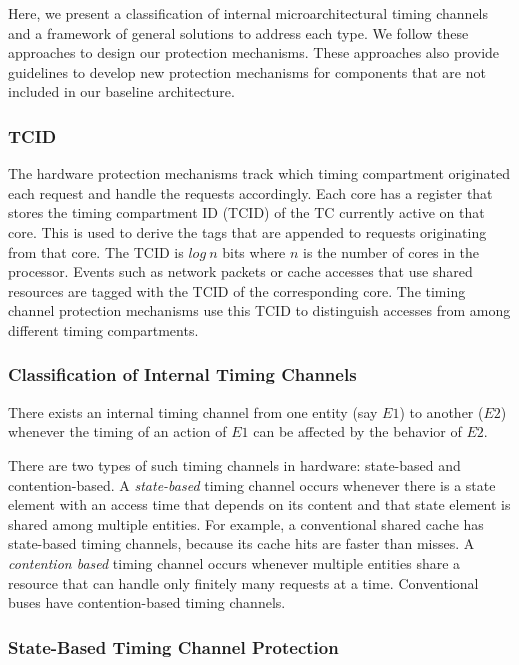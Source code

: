 Here, we present a classification of internal microarchitectural timing channels 
and a framework of general solutions to address each type.
We follow these approaches to design our
protection mechanisms. These approaches also provide guidelines to
develop new protection mechanisms for components that are not included in
our baseline architecture.

\subsubsection{TCID}

The hardware protection mechanisms track which timing compartment originated 
each request and handle the requests accordingly. Each core has a register that 
stores the timing compartment ID (TCID) of the TC currently active on that core. This is used to derive 
the tags that are appended to requests originating from that core. The TCID is 
$log\ n$ bits where $n$ is the number of cores in the processor.
Events such as network packets or cache accesses that use shared resources are 
tagged with the TCID of the corresponding core. 
The timing channel protection mechanisms use this TCID to distinguish accesses
from among different timing compartments.

\subsubsection{Classification of Internal Timing Channels}

There exists an internal timing channel from one entity (say $E1$)
to another ($E2$) whenever the timing of an action of $E1$ can be affected 
by the behavior of $E2$.

There are two types of such timing channels in hardware: state-based
and contention-based.
A \emph{state-based} timing channel occurs whenever there is a state element 
with an access time that depends on its content and that state element is 
shared among multiple entities.
For example, a conventional shared cache has state-based timing channels, because 
its cache hits are faster than misses.
A \emph{contention based} timing channel occurs whenever multiple entities 
share a resource that can handle only finitely many requests at a time.
Conventional buses have contention-based timing channels.

\subsubsection{State-Based Timing Channel Protection}

